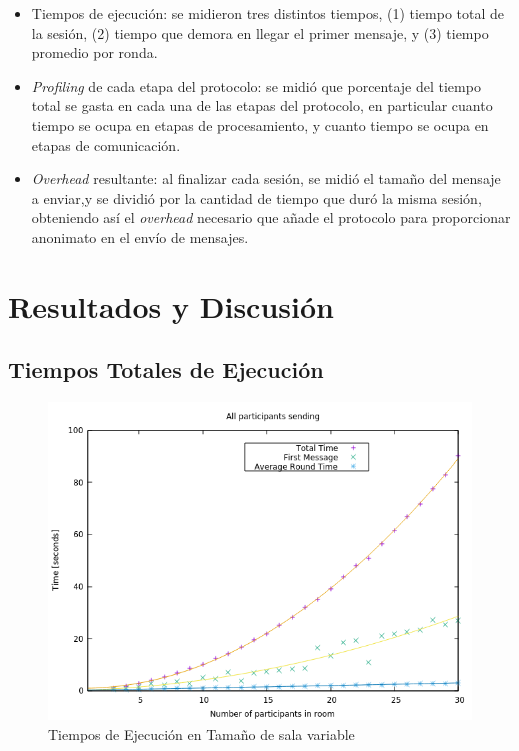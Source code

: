 \begin{itemize}
	\item Tiempos de ejecución: se midieron tres distintos tiempos, (1) tiempo 
	total de la sesión, (2) tiempo que demora en llegar el primer mensaje, y 
	(3) tiempo promedio por ronda.
	\item \emph{Profiling} de cada etapa del protocolo: se midió que 
	porcentaje del tiempo total se gasta en cada una de las etapas del 
	protocolo, en particular cuanto tiempo se ocupa en etapas de 
	procesamiento, y cuanto tiempo se ocupa en etapas de comunicación.
	\item \emph{Overhead} resultante: al finalizar cada sesión, se midió el 
	tamaño del mensaje a enviar,y se dividió por la cantidad de tiempo que 
	duró la misma sesión, obteniendo así el \emph{overhead} necesario que añade
	el protocolo para proporcionar anonimato en el envío de mensajes.
\end{itemize}

\section{Resultados y Discusión}

\subsection{Tiempos Totales de Ejecución}

\begin{figure}[H]
  \centering
    \includegraphics[scale=0.7]{logs/logs_all/times.png}
  \caption{Tiempos de Ejecución en Tamaño de sala variable}
  \label{fig:times-variable}
\end{figure}

